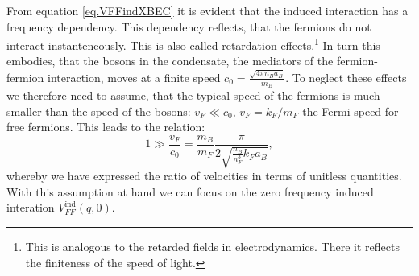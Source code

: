 From equation \eqref{eq.VFFindXBEC} it is evident that the induced interaction has a frequency dependency. This dependency reflects, that the fermions do not interact instanteneously. This is also called retardation effects.\footnote{This is analogous to the retarded fields in electrodynamics. There it reflects the finiteness of the speed of light.} In turn this embodies, that the bosons in the condensate, the mediators of the fermion-fermion interaction, moves at a finite speed $c_0 = \frac{\sqrt{4\pi n_B a_B}}{m_B}$. To neglect these effects we therefore need to assume, that the typical speed of the fermions is much smaller than the speed of the bosons: $v_F \ll c_0$, $v_F = k_F/m_F$ the Fermi speed for free fermions. This leads to the relation:
\begin{equation}
1 \gg \frac{v_F}{c_0} = \frac{m_B}{m_F}\frac{\pi}{2\sqrt{\frac{n_B}{n_F^3}k_Fa_B}}, 
\label{eq.RetardationEffectsneglectionassumption}
\end{equation}
whereby we have expressed the ratio of velocities in terms of unitless quantities. With this assumption at hand we can focus on the zero frequency induced interation $V_{FF}^\text{ind}(q,0)$. 

